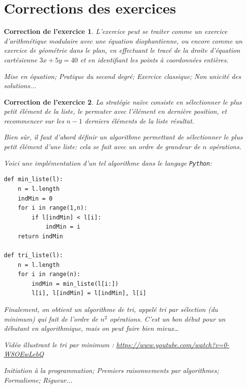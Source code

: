 \documentclass[12pt]{article}
\theoremstyle{break}
\newtheorem{cor}{Correction de l'exercice}
\begin{document}
\pagebreak


\section*{Corrections des exercices}

\begin{cor}
\textit{L'exercice peut se traiter comme un exercice d'arithmétique modulaire avec une équation diophantienne, ou encore comme un exercice de géométrie dans le plan, en effectuant le tracé de la droite d'équation cartésienne $3x + 5y = 40$ et en identifiant les points à coordonnées entières.}\newline



\textit{Mise en équation; Pratique du second degré; Exercice classique; Non unicité des solutions...}
\end{cor}


\begin{cor}
La stratégie \textit{naïve} consiste en sélectionner le plus petit élément de la liste, le permuter avec l'élément en dernière position, et recommencer sur les $n-1$ derniers éléments de la liste résultat.

Bien sûr, il faut d'abord définir un algorithme permettant de sélectionner le plus petit élément d'une liste: cela se fait avec un ordre de grandeur de $n$ opérations.\newline



Voici une implémentation d'un tel algorithme dans le langage \verb|Python|:

\begin{lstlisting}
def min_liste(l):
	n = l.length
	indMin = 0
    for i in range(1,n):
    	if l[indMin] < l[i]:
        	indMin = i
    return indMin

def tri_liste(l):
	n = l.length
    for i in range(n):
    	indMin = min_liste(l[i:])
        l[i], l[indMin] = l[indMin], l[i]
\end{lstlisting} 


Finalement, on obtient un algorithme de tri, appelé \textit{tri par sélection (du minimum)} qui fait de l'ordre de $n^2$ opérations. C'est un bon début pour un débutant en algorithmique, mais on peut faire bien mieux\ldots

Vidéo illustrant le tri par minimum : \url{https://www.youtube.com/watch?v=0-W8OEwLebQ}
\newline

\textit{Initiation à la programmation; Premiers raisonnements par algorithmes; Formalisme; Rigueur...}
\end{cor}
\end{document}
